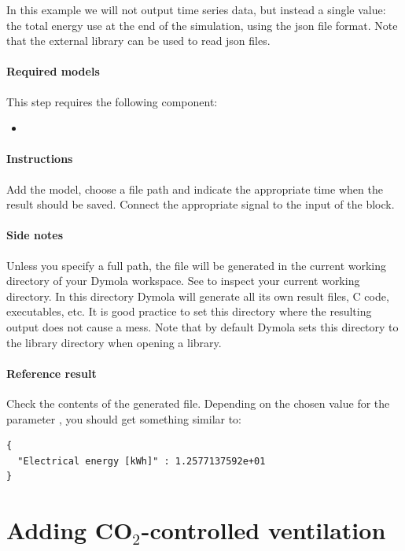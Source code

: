 \documentclass[10pt,a4paper]{article}
\begin{document}
In this example we will not output time series data, but instead a single value: the total
energy use at the end of the simulation, using the json file format. 
Note that the external library  can be used to read json files.


\paragraph{Required models}
This step requires the following component:
\begin{itemize}
\item {}
\end{itemize}

\paragraph{Instructions}
Add the model, choose a file path and indicate the appropriate time when 
the result should be saved.
Connect the appropriate signal to the input of the block.

\paragraph{Side notes}
Unless you specify a full path, the file will be generated in
the current working directory of your Dymola workspace.
See  to inspect your current
working directory.
In this directory Dymola will generate all its own result files, C code, executables, etc.
It is good practice to set this directory where the resulting output does not cause a mess.
Note that by default Dymola sets this directory to the library directory when opening a library.

\paragraph{Reference result}
Check the contents of the generated file. 
Depending on the chosen value for the parameter , 
you should get something similar to:
\begin{verbatim}
{
  "Electrical energy [kWh]" : 1.2577137592e+01
}
\end{verbatim}

\newpage

\section{Adding CO$_2$-controlled ventilation}
\end{document}
